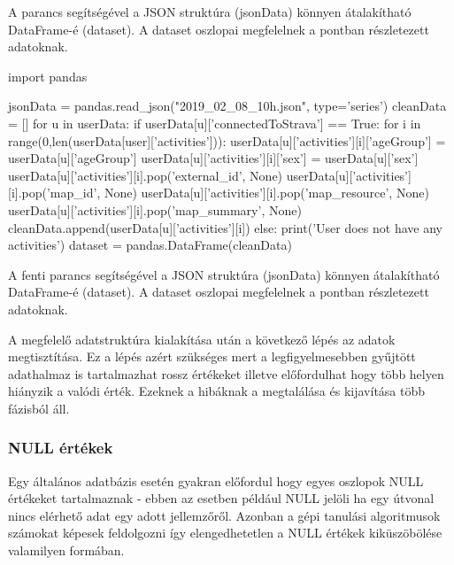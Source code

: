 \begin{programreszlet}
A  parancs segítségével a JSON struktúra (jsonData) könnyen átalakítható DataFrame-é (dataset). A dataset oszlopai megfelelnek a  pontban részletezett adatoknak.
\begin{python}
import pandas

jsonData = pandas.read_json("2019_02_08_10h.json", type='series')
cleanData = []
for u in userData:
  if userData[u]['connectedToStrava'] == True:
    for i in range(0,len(userData[user]['activities'])):
       userData[u]['activities'][i]['ageGroup'] = userData[u]['ageGroup']
       userData[u]['activities'][i]['sex'] = userData[u]['sex']
       userData[u]['activities'][i].pop('external_id', None)
       userData[u]['activities'][i].pop('map_id', None)
       userData[u]['activities'][i].pop('map_resource', None)
       userData[u]['activities'][i].pop('map_summary', None)
       cleanData.append(userData[u]['activities'][i]) 
  else:
    print('User does not have any activities')
dataset = pandas.DataFrame(cleanData)

\end{python}
\end{programreszlet}


A fenti parancs segítségével a JSON struktúra (jsonData) könnyen átalakítható DataFrame-é (dataset). A dataset oszlopai megfelelnek a  pontban részletezett adatoknak.


A megfelelő adatstruktúra kialakítása után a következő lépés az adatok megtisztítása. Ez a lépés azért szükséges mert a legfigyelmesebben gyűjtött adathalmaz is tartalmazhat rossz értékeket illetve előfordulhat hogy több helyen hiányzik a valódi érték. Ezeknek a hibáknak a megtalálása és kijavítása több fázisból áll.



\subsubsection{NULL értékek}
Egy általános adatbázis esetén gyakran előfordul hogy egyes oszlopok NULL értékeket tartalmaznak - ebben az esetben például NULL jelöli ha egy útvonal nincs elérhető adat egy adott jellemzőről. Azonban a gépi tanulási algoritmusok számokat képesek feldolgozni így elengedhetetlen a NULL értékek kiküszöbölése valamilyen formában.


